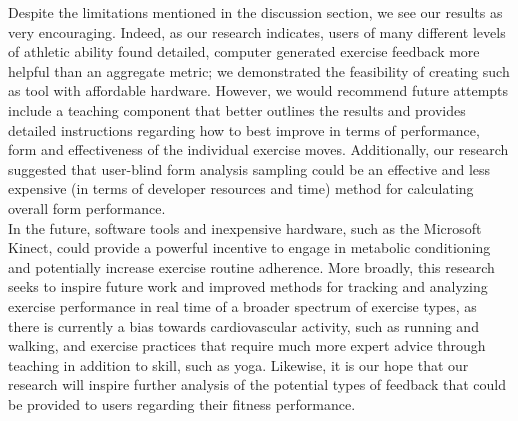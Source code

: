 Despite the limitations mentioned in the discussion section, we see our results as very encouraging. Indeed, as our research indicates, users of many different levels of athletic ability found detailed, computer generated exercise feedback more helpful than an aggregate metric; we demonstrated the feasibility of creating such as tool with affordable hardware.  However, we would recommend future attempts include a teaching component that better outlines the results and provides detailed instructions regarding how to best improve in terms of performance, form and effectiveness of the individual exercise moves.  Additionally, our research suggested that user-blind form analysis sampling could be an effective and less expensive (in terms of developer resources and time)  method for calculating overall form performance.\\
In the future, software tools and inexpensive hardware, such as the Microsoft Kinect, could provide a powerful incentive to engage in  metabolic conditioning and potentially increase exercise routine adherence.  More broadly, this research seeks to inspire future work and improved methods for tracking and analyzing exercise performance in real time of a broader spectrum of exercise types, as there is currently a bias towards cardiovascular activity, such as running and walking, and exercise practices that require much more expert advice through teaching in addition to skill, such as yoga.  Likewise, it is our hope that our research will inspire further analysis of the potential types of feedback that could be provided to users regarding their fitness performance.



